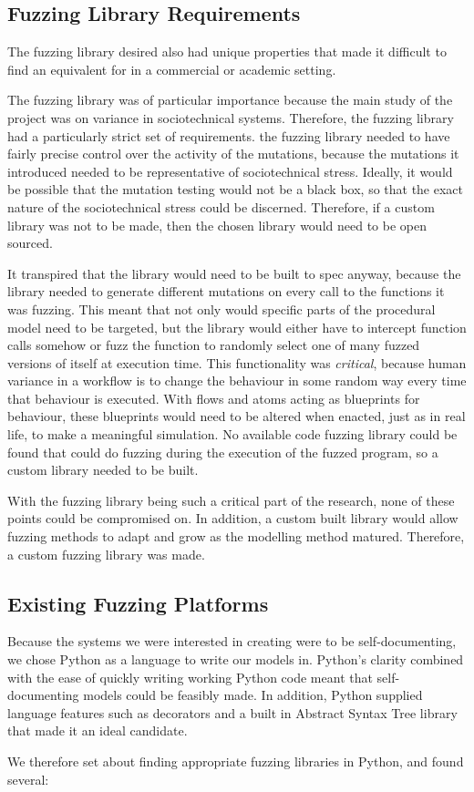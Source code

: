\subsection{Fuzzing Library Requirements}\label{planning_fuzzing}
The fuzzing library desired also had unique properties that made it difficult to find an equivalent for in a commercial or academic setting. \par
The fuzzing library was of particular importance because the main study of the project was on variance in sociotechnical systems. Therefore, the fuzzing library had a particularly strict set of requirements. the fuzzing library needed to have fairly precise control over the activity of the mutations, because the mutations it introduced needed to be representative of sociotechnical stress. Ideally, it would be possible that the mutation testing would not be a black box, so that the exact nature of the sociotechnical stress could be discerned. Therefore, if a custom library was not to be made, then the chosen library would need to be open sourced. \par
It transpired that the library would need to be built to spec anyway, because the library needed to generate different mutations on every call to the functions it was fuzzing. This meant that not only would specific parts of the procedural model need to be targeted, but the library would either have to intercept function calls somehow or fuzz the function to randomly select one of many fuzzed versions of itself at execution time. This functionality was \emph{critical}, because human variance in a workflow is to change the behaviour in some random way every time that behaviour is executed. With flows and atoms acting as blueprints for behaviour, these blueprints would need to be altered when enacted, just as in real life, to make a meaningful simulation. No available code fuzzing library could be found that could do fuzzing during the execution of the fuzzed program, so a custom library needed to be built. \par
With the fuzzing library being such a critical part of the research, none of these points could be compromised on. In addition, a custom built library would allow fuzzing methods to adapt and grow as the modelling method matured. Therefore, a custom fuzzing library was made. \par

\subsection{Existing Fuzzing Platforms}
\label{research_fuzzing}
Because the systems we were interested in creating were to be self-documenting, we chose Python as a language to write our models in. Python's clarity combined with the ease of quickly writing working Python code meant that self-documenting models could be feasibly made. In addition, Python supplied language features such as decorators and a built in Abstract Syntax Tree library that made it an ideal candidate. \par
We therefore set about finding appropriate fuzzing libraries in Python, and found several:

